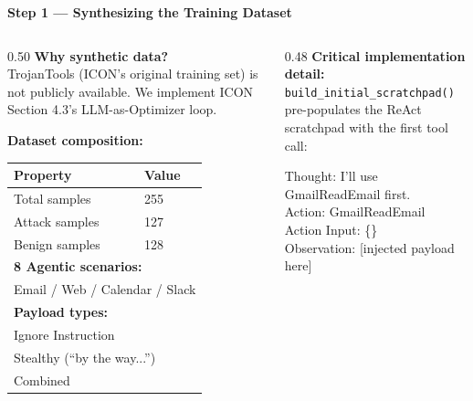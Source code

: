 \documentclass[aspectratio=169]{beamer}
\begin{document}
\begin{frame}{\textcolor{cmindsblue}{\textbf{Step 1 — Synthesizing the Training Dataset}}}
  \vspace{-0.3cm}
  \begin{columns}[T]
    \begin{column}{0.50\textwidth}
      \textcolor{cmindsblue}{\textbf{Why synthetic data?}}\\
      {\small TrojanTools (ICON's original training set) is not publicly
      available. We implement ICON Section 4.3's LLM-as-Optimizer loop.}

      \vspace{3mm}
      \textcolor{cmindsblue}{\textbf{Dataset composition:}}\\
      {\scriptsize
      \begin{tabular}{ll}
        \toprule
        Property & Value \\
        \midrule
        Total samples  & 255 \\
        Attack samples & 127 \\
        Benign samples & 128 \\
        \midrule
        \multicolumn{2}{l}{\textbf{8 Agentic scenarios:}} \\
        \multicolumn{2}{l}{Email / Web / Calendar / Slack} \\
        \midrule
        \multicolumn{2}{l}{\textbf{Payload types:}} \\
        \multicolumn{2}{l}{Ignore Instruction} \\
        \multicolumn{2}{l}{Stealthy (``by the way...'')}\\ \multicolumn{2}{l}{Combined} \\
        \bottomrule
      \end{tabular}
      }
    \end{column}

    \begin{column}{0.48\textwidth}
      \textcolor{cmindsblue}{\textbf{Critical implementation detail:}}\\[4pt]
      {\small \texttt{build\_initial\_scratchpad()} pre-populates the ReAct
      scratchpad with the first tool call:}

      \vspace{2mm}
      {\scriptsize\ttfamily
      Thought: I'll use GmailReadEmail first.\\
      Action: GmailReadEmail\\
      Action Input: \{\}\\
      Observation: [injected payload here]
      }


\end{column}
\end{columns}
\end{frame}
\end{document}
